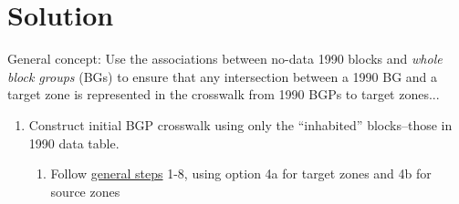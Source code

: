 \documentclass{article}
\begin{document}
\section{Solution}

General concept: Use the associations between no-data 1990 blocks and \textit{whole block groups} (BGs) to ensure that any intersection between a 1990 BG and a target zone is represented in the crosswalk from 1990 BGPs to target zones...

\begin{enumerate}

\item Construct initial BGP crosswalk using only the ``inhabited'' blocks--those in 1990 data table.
    \begin{enumerate}
    \item Follow \href{https://github.com/jGaboardi/nhgisxwalk/blob/master/resources/general-crosswalk-construction-framework.pdf}{general steps} 1-8, using option 4a for target zones and 4b for source zones
    \end{enumerate}


\end{enumerate}
\end{document}
